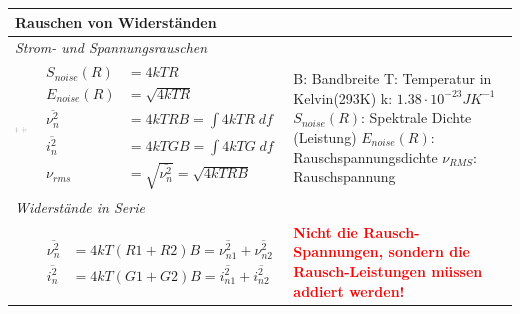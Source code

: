 \begin{longtable}[t]{|p{4cm}|p{6.5cm}|p{7cm}|}
    \hline
    \multicolumn{3}{|l|}{\bf Rauschen von Widerständen}
    \\ \hline
    \multicolumn{3}{|l|}{\textit{Strom- und Spannungsrauschen}}
    \\ \hdashline
    \includegraphics[width=4cm, valign=t]{pictures/widerstandrauschen.png}
    & {	\vspace{-1.8\topsep}
        \begin{align*}
            S_{noise}(R) &=4kTR\\
            E_{noise}(R) &=\sqrt{4kTR}\\
            \overline{\nu^2_{n}} &=4kTRB = \int 4kTR \; df\\
            \overline{i^2_{n}} &=4kTGB = \int 4kTG \; df\\
            \nu_{rms} &= \sqrt{\overline{\nu^2_{n}}} = \sqrt{4kTRB}
        \end{align*}
      }
    & {B: Bandbreite\newline
       T:  Temperatur in Kelvin(293K)\newline
       k:  $1.38 \cdot 10^{-23}JK^{-1}$\newline
       $S_{noise}(R)$:  Spektrale Dichte (Leistung)\newline
       $E_{noise}(R)$: Rauschspannungsdichte\newline
       $\nu_{RMS}$:  Rauschspannung
      }
    \\ \hline
    \multicolumn{3}{|l|}{\textit{Widerstände in Serie}}
    \\ \hdashline
    
    & {	\vspace{-1.6\topsep}
        \begin{align*}
            \overline{\nu^2_{n}}&=4kT(R1+R2)B=\overline{\nu^2_{n1}}+\overline{\nu^2_{n2}}\\
            \overline{i^2_{n}}&=4kT(G1+G2)B=\overline{i^2_{n1}}+\overline{i^2_{n2}}
        \end{align*}
    }
    & {\textcolor{red}{\bf Nicht die Rausch-Spannungen, sondern die Rausch-Leistungen müssen addiert werden!}
    }
    \\ \hline
\end{longtable}
